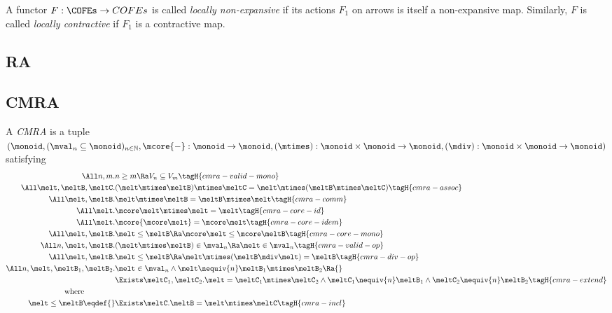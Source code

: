 \begin{defn}
  A functor $F : \COFEs \to COFEs$ is called \emph{locally non-expansive} if its actions $F_1$ on arrows is itself a non-expansive map.
  Similarly, $F$ is called \emph{locally contractive} if $F_1$ is a contractive map.
\end{defn}

\subsection{RA}


\subsection{CMRA}

\begin{defn}
  A \emph{CMRA} is a tuple $(\monoid, (\mval_n \subseteq \monoid)_{n \in \mathbb{N}}, \mcore{-}: \monoid \to \monoid, (\mtimes) : \monoid \times \monoid \to \monoid, (\mdiv) : \monoid \times \monoid \to \monoid)$ satisfying
  \begin{align*}
    \All n, m.& n \geq m \Ra V_n \subseteq V_m \tagH{cmra-valid-mono} \\
    \All \melt, \meltB, \meltC.& (\melt \mtimes \meltB) \mtimes \meltC = \melt \mtimes (\meltB \mtimes \meltC) \tagH{cmra-assoc} \\
    \All \melt, \meltB.& \melt \mtimes \meltB = \meltB \mtimes \melt \tagH{cmra-comm} \\
    \All \melt.& \mcore\melt \mtimes \melt = \melt \tagH{cmra-core-id} \\
    \All \melt.& \mcore{\mcore\melt} = \mcore\melt \tagH{cmra-core-idem} \\
    \All \melt, \meltB.& \melt \leq \meltB \Ra \mcore\melt \leq \mcore\meltB \tagH{cmra-core-mono} \\
    \All n, \melt, \meltB.& (\melt \mtimes \meltB) \in \mval_n \Ra \melt \in \mval_n \tagH{cmra-valid-op} \\
    \All \melt, \meltB.& \melt \leq \meltB \Ra \melt \mtimes (\meltB \mdiv \melt) = \meltB \tagH{cmra-div-op} \\
    \All n, \melt, \meltB_1, \meltB_2.& \omit\rlap{$\melt \in \mval_n \land \melt \nequiv{n} \meltB_1 \mtimes \meltB_2 \Ra {}$} \\
    &\Exists \meltC_1, \meltC_2. \melt = \meltC_1 \mtimes \meltC_2 \land \meltC_1 \nequiv{n} \meltB_1 \land \meltC_2 \nequiv{n} \meltB_2 \tagH{cmra-extend} \\
    \text{where}\qquad\qquad\\
    \melt \leq \meltB \eqdef{}& \Exists \meltC. \meltB = \melt \mtimes \meltC \tagH{cmra-incl}
  \end{align*}
\end{defn}

